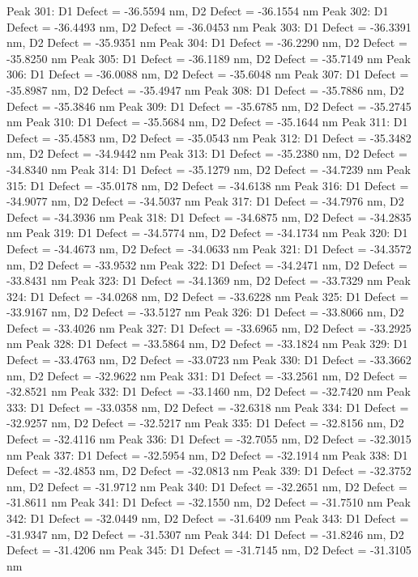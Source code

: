 \documentclass{article}
\begin{document}
Peak 301: D1 Defect = -36.5594 nm, D2 Defect = -36.1554 nm
Peak 302: D1 Defect = -36.4493 nm, D2 Defect = -36.0453 nm
Peak 303: D1 Defect = -36.3391 nm, D2 Defect = -35.9351 nm
Peak 304: D1 Defect = -36.2290 nm, D2 Defect = -35.8250 nm
Peak 305: D1 Defect = -36.1189 nm, D2 Defect = -35.7149 nm
Peak 306: D1 Defect = -36.0088 nm, D2 Defect = -35.6048 nm
Peak 307: D1 Defect = -35.8987 nm, D2 Defect = -35.4947 nm
Peak 308: D1 Defect = -35.7886 nm, D2 Defect = -35.3846 nm
Peak 309: D1 Defect = -35.6785 nm, D2 Defect = -35.2745 nm
Peak 310: D1 Defect = -35.5684 nm, D2 Defect = -35.1644 nm
Peak 311: D1 Defect = -35.4583 nm, D2 Defect = -35.0543 nm
Peak 312: D1 Defect = -35.3482 nm, D2 Defect = -34.9442 nm
Peak 313: D1 Defect = -35.2380 nm, D2 Defect = -34.8340 nm
Peak 314: D1 Defect = -35.1279 nm, D2 Defect = -34.7239 nm
Peak 315: D1 Defect = -35.0178 nm, D2 Defect = -34.6138 nm
Peak 316: D1 Defect = -34.9077 nm, D2 Defect = -34.5037 nm
Peak 317: D1 Defect = -34.7976 nm, D2 Defect = -34.3936 nm
Peak 318: D1 Defect = -34.6875 nm, D2 Defect = -34.2835 nm
Peak 319: D1 Defect = -34.5774 nm, D2 Defect = -34.1734 nm
Peak 320: D1 Defect = -34.4673 nm, D2 Defect = -34.0633 nm
Peak 321: D1 Defect = -34.3572 nm, D2 Defect = -33.9532 nm
Peak 322: D1 Defect = -34.2471 nm, D2 Defect = -33.8431 nm
Peak 323: D1 Defect = -34.1369 nm, D2 Defect = -33.7329 nm
Peak 324: D1 Defect = -34.0268 nm, D2 Defect = -33.6228 nm
Peak 325: D1 Defect = -33.9167 nm, D2 Defect = -33.5127 nm
Peak 326: D1 Defect = -33.8066 nm, D2 Defect = -33.4026 nm
Peak 327: D1 Defect = -33.6965 nm, D2 Defect = -33.2925 nm
Peak 328: D1 Defect = -33.5864 nm, D2 Defect = -33.1824 nm
Peak 329: D1 Defect = -33.4763 nm, D2 Defect = -33.0723 nm
Peak 330: D1 Defect = -33.3662 nm, D2 Defect = -32.9622 nm
Peak 331: D1 Defect = -33.2561 nm, D2 Defect = -32.8521 nm
Peak 332: D1 Defect = -33.1460 nm, D2 Defect = -32.7420 nm
Peak 333: D1 Defect = -33.0358 nm, D2 Defect = -32.6318 nm
Peak 334: D1 Defect = -32.9257 nm, D2 Defect = -32.5217 nm
Peak 335: D1 Defect = -32.8156 nm, D2 Defect = -32.4116 nm
Peak 336: D1 Defect = -32.7055 nm, D2 Defect = -32.3015 nm
Peak 337: D1 Defect = -32.5954 nm, D2 Defect = -32.1914 nm
Peak 338: D1 Defect = -32.4853 nm, D2 Defect = -32.0813 nm
Peak 339: D1 Defect = -32.3752 nm, D2 Defect = -31.9712 nm
Peak 340: D1 Defect = -32.2651 nm, D2 Defect = -31.8611 nm
Peak 341: D1 Defect = -32.1550 nm, D2 Defect = -31.7510 nm
Peak 342: D1 Defect = -32.0449 nm, D2 Defect = -31.6409 nm
Peak 343: D1 Defect = -31.9347 nm, D2 Defect = -31.5307 nm
Peak 344: D1 Defect = -31.8246 nm, D2 Defect = -31.4206 nm
Peak 345: D1 Defect = -31.7145 nm, D2 Defect = -31.3105 nm
\end{document}
